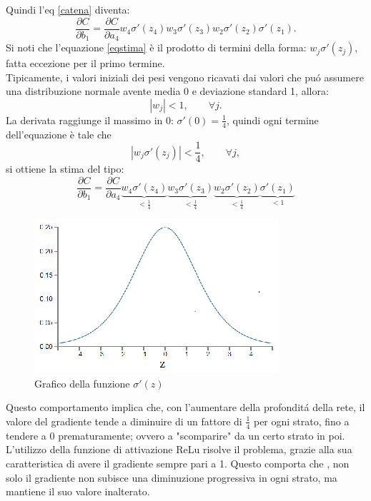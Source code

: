 \documentclass[a4paper,12pt]{report}
\begin{document}
Quindi l'eq \ref{catena} diventa:
\begin{equation}\label{eqstima}
\frac{\partial C}{\partial b_1}= \frac{\partial C}{\partial a_4} w_4 \sigma ' (z_4) w_3 \sigma ' (z_3) w_2 \sigma '(z_2) \sigma '(z_1).
\end{equation}
Si noti che l'equazione \ref{eqstima} \`e il prodotto di termini della forma: $w_j  \sigma '(z_j)$, fatta eccezione per il primo termine.\\
Tipicamente, i valori iniziali dei pesi vengono ricavati dai valori che pu\'{o} assumere una distribuzione normale avente media 0 e deviazione standard 1, allora: $$|w_j|<1,\qquad \forall j.$$
La derivata raggiunge il massimo in 0: $\sigma '(0)=\frac{1}{4}$, quindi ogni termine dell'equazione \`e tale che $$|w_j \sigma '(z_j)| < \frac{1}{4}, \qquad \forall j,$$ si ottiene la stima del tipo:
\begin{equation}
\frac{\partial C}{\partial b_1}= \frac{\partial C}{\partial a_4} \underbrace{w_4 \sigma '(z_4)}_{<\frac{1}{4}} \underbrace{w_3 \sigma '(z_3)}_{< \frac{1}{4}} \underbrace{w_2 \sigma '(z_2)}_{< \frac{1}{4}}\underbrace{\sigma '(z_1)}_{< 1} \nonumber
\end{equation}
\begin{figure}[!h]
\centering
\includegraphics[scale=2]{derivataSigmoid}
\caption{Grafico della funzione $\sigma '(z)$}
\end{figure}
\newpage
Questo comportamento implica che, con l'aumentare della profondit\'{a} della rete, il valore del gradiente tende a diminuire di un fattore di $\frac{1}{4}$ per ogni strato, fino a tendere a 0 prematuramente; ovvero a "scomparire" da un certo strato in poi.\\
L'utilizzo della funzione di attivazione ReLu risolve il problema, grazie alla sua caratteristica di avere il gradiente sempre pari a 1. Questo comporta che , non solo il gradiente non subisce una diminuzione progressiva in ogni strato, ma mantiene il suo valore inalterato.\\
\end{document}
